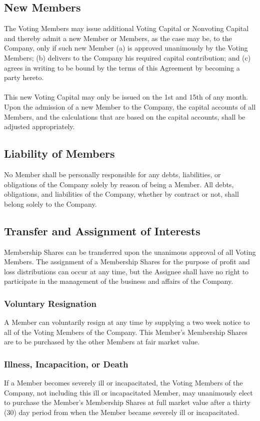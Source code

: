 \documentclass[11pt]{article}
\begin{document}
\subsection{New Members}
The Voting Members may issue additional Voting Capital or Nonvoting Capital and thereby admit a new Member or Members, as the case may be, to the Company, only if such new Member (a) is approved unanimously by the Voting Members; (b) delivers to the Company his required capital contribution; and (c) agrees in writing to be bound by the terms of this Agreement by becoming a party hereto.\\\\
This new Voting Capital may only be issued on the 1st and 15th of any month. Upon the admission of a new Member to the Company, the capital accounts of all Members, and the calculations that are based on the capital accounts, shall be adjusted appropriately.

\subsection{Liability of Members}
No Member shall be personally responsible for any debts, liabilities, or obligations of the Company solely by reason of being a Member. All debts, obligations, and liabilities of the Company, whether by contract or not, shall belong solely to the Company.

\subsection{Transfer and Assignment of Interests}
Membership Shares can be transferred upon the unanimous approval of all Voting Members. The assignment of a Membership Shares for the purpose of profit and loss distributions can occur at any time, but the Assignee shall have no right to participate in the management of the business and affairs of the Company.

\subsubsection{Voluntary Resignation}
A Member can voluntarily resign at any time by supplying a two week notice to all of the Voting Members of the Company. This Member’s Membership Shares are to be purchased by the other Members at fair market value.

\subsubsection{Illness, Incapacition, or Death}
If a Member becomes severely ill or incapacitated, the Voting Members of the Company, not including this ill or incapacitated Member, may unanimously elect to purchase the Member's Membership Shares at full market value after a thirty (30) day period from when the Member became severely ill or incapacitated.
\end{document}
